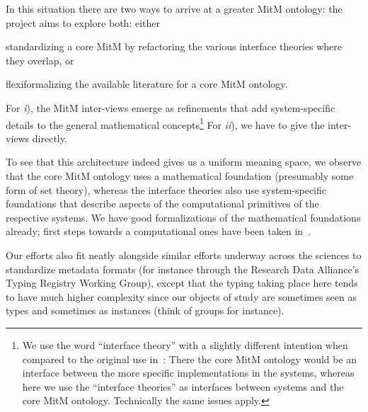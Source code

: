 In this situation there are two ways to arrive at a greater MitM ontology: the \ODK
project aims to explore both: either
\begin{inparaenum}[\em i\rm)] 
\item standardizing a core MitM by refactoring the various interface theories where they
  overlap, or
\item flexiformalizing the available literature for a core MitM ontology.
\end{inparaenum}
For \emph{i}), the MitM inter-views emerge as refinements that add system-specific details
to the general mathematical concepts\footnote{We use the word ``interface theory'' with a
  slightly different intention when compared to the original use
  in~\cite{KohRabSac:fvip11}: There the core MitM ontology would be an interface between
  the more specific implementations in the systems, whereas here we use the ``interface
  theories'' as interfaces between systems and the core MitM ontology. Technically the
  same issues apply.} For \emph{ii}), we have to give the inter-views directly. 

To see that this architecture indeed gives us a uniform meaning space, we observe that the
core MitM ontology uses a mathematical foundation (presumably some form of set theory),
whereas the interface theories also use system-specific foundations that describe aspects
of the computational primitives of the respective systems. We have good formalizations of
the mathematical foundations already; first steps towards a computational ones have been
taken in~\cite{KohManRab:aumftg13}.

Our efforts also fit neatly alongside similar efforts underway across the sciences to
standardize metadata formats (for instance through the Research Data Alliance's Typing
Registry Working Group\cite{rda-typing}), except that the typing taking place here tends
to have much higher complexity since our objects of study are sometimes seen as types and
sometimes as instances (think of groups for instance). 


